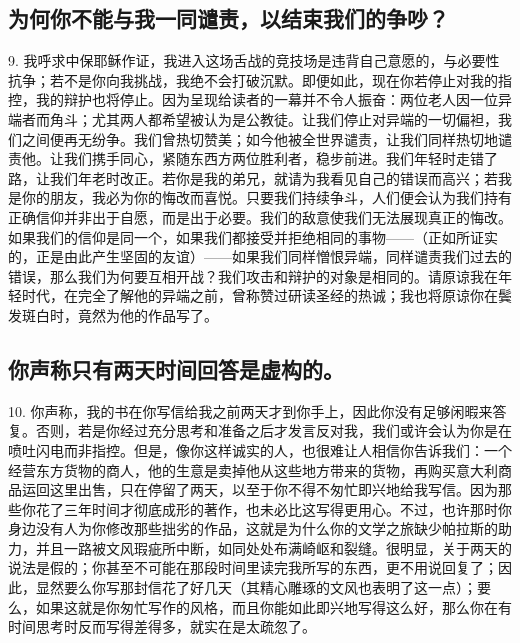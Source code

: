 
\subsection{为何你不能与我一同谴责，以结束我们的争吵？}

9. 我呼求中保耶稣作证，我进入这场舌战的竞技场是违背自己意愿的，与必要性抗争；若不是你向我挑战，我绝不会打破沉默。即便如此，现在你若停止对我的指控，我的辩护也将停止。因为呈现给读者的一幕并不令人振奋：两位老人因一位异端者而角斗；尤其两人都希望被认为是公教徒。让我们停止对异端的一切偏袒，我们之间便再无纷争。我们曾热切赞美；如今他被全世界谴责，让我们同样热切地谴责他。让我们携手同心，紧随东西方两位胜利者，稳步前进。我们年轻时走错了路，让我们年老时改正。若你是我的弟兄，就请为我看见自己的错误而高兴；若我是你的朋友，我必为你的悔改而喜悦。只要我们持续争斗，人们便会认为我们持有正确信仰并非出于自愿，而是出于必要。我们的敌意使我们无法展现真正的悔改。如果我们的信仰是同一个，如果我们都接受并拒绝相同的事物——（正如所证实的，正是由此产生坚固的友谊）——如果我们同样憎恨异端，同样谴责我们过去的错误，那么我们为何要互相开战？我们攻击和辩护的对象是相同的。请原谅我在年轻时代，在完全了解他的异端之前，曾称赞过研读圣经的热诚；我也将原谅你在鬓发斑白时，竟然为他的作品写了。\par


\subsection{你声称只有两天时间回答是虚构的。}

10. 你声称，我的书在你写信给我之前两天才到你手上，因此你没有足够闲暇来答复。否则，若是你经过充分思考和准备之后才发言反对我，我们或许会认为你是在喷吐闪电而非指控。但是，像你这样诚实的人，也很难让人相信你告诉我们：一个经营东方货物的商人，他的生意是卖掉他从这些地方带来的货物，再购买意大利商品运回这里出售，只在停留了两天，以至于你不得不匆忙即兴地给我写信。因为那些你花了三年时间才彻底成形的著作，也未必比这写得更用心。不过，也许那时你身边没有人为你修改那些拙劣的作品，这就是为什么你的文学之旅缺少帕拉斯的助力，并且一路被文风瑕疵所中断，如同处处布满崎岖和裂缝。很明显，关于两天的说法是假的；你甚至不可能在那段时间里读完我所写的东西，更不用说回复了；因此，显然要么你写那封信花了好几天（其精心雕琢的文风也表明了这一点）；要么，如果这就是你匆忙写作的风格，而且你能如此即兴地写得这么好，那么你在有时间思考时反而写得差得多，就实在是太疏忽了。\par

